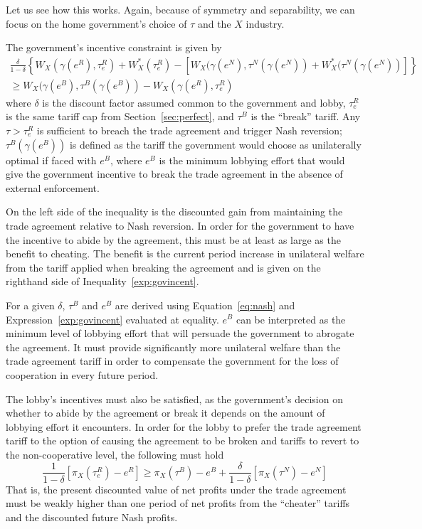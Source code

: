 \documentclass[12pt,titlepage]{article}
\newcommand{\ga}{\gamma}
\newcommand{\de}{\delta}
\begin{document}
Let us see how this works. Again, because of symmetry and separability, we can focus on the home government's choice of $\tau$ and the $X$ industry.

The government's incentive constraint is given by
  \begin{multline}
    \frac{\de}{1-\de} \left\{W_X(\ga(e^R),\tau_e^R) + W_X^*(\tau_e^R) - \left[W_X(\ga(e^N),\tau^N(\ga(e^N)) + W_X^*(\tau^N(\ga(e^N)) \right] \right\} \\ \geq W_X(\ga(e^B),\tau^B(\ga(e^B)) - W_X(\ga(e^R),\tau_e^R)
		\label{exp:govincent}
  \end{multline}
where $\de$ is the discount factor assumed common to the government and lobby, $\tau_e^R$ is the same tariff cap from Section~\ref{sec:perfect}, and $\tau^B$ is the ``break'' tariff. Any $\tau > \tau_e^R$ is sufficient to breach the trade agreement and trigger Nash reversion; $\tau^B(\ga(e^B))$ is defined as the tariff the government would choose as unilaterally optimal if faced with $e^B$, where $e^B$ is the minimum lobbying effort that would give the government incentive to break the trade agreement in the absence of external enforcement.

On the left side of the inequality is the discounted gain from maintaining the trade agreement relative to Nash reversion. In order for the government to have the incentive to abide by the agreement, this must be at least as large as the benefit to cheating. The benefit is the current period increase in unilateral welfare from the tariff applied when breaking the agreement and is given on the righthand side of Inequality~\ref{exp:govincent}.

For a given $\de$, $\tau^B$ and $e^B$ are derived using Equation~\ref{eq:nash} and Expression~\ref{exp:govincent} evaluated at equality. $e^B$ can be interpreted as the minimum level of lobbying effort that will persuade the government to abrogate the agreement. It must provide significantly more unilateral welfare than the trade agreement tariff in order to compensate the government for the loss of cooperation in every future period.

The lobby's incentives must also be satisfied, as the government's decision on whether to abide by the agreement or break it depends on the amount of lobbying effort it encounters. In order for the lobby to prefer the trade agreement tariff to the option of causing the agreement to be broken and tariffs to revert to the non-cooperative level, the following must hold
\begin{equation}
  \frac{1}{1-\de}\left[\pi_X(\tau_e^R) - e^R\right] \geq \pi_X(\tau^B) - e^B + \frac{\de}{1-\de}\left[\pi_X(\tau^N) - e^N\right]
	\label{exp:lobby}
\end{equation}
That is, the present discounted value of net profits under the trade agreement must be weakly higher than one period of net profits from the ``cheater'' tariffs and the discounted future Nash profits.
\end{document}
